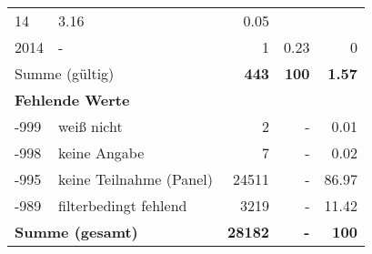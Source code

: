 \begin{longtable}{lXrrr}
       \num{14} &
       \num[round-mode=places,round-precision=2]{3.16} &
         \num[round-mode=places,round-precision=2]{0.05} \\

     2014 &
     \multicolumn{1}{X}{ -  } &


       \num{1} &
       \num[round-mode=places,round-precision=2]{0.23} &
         \num[round-mode=places,round-precision=2]{0} \\
     \midrule
     \multicolumn{2}{l}{Summe (gültig)} &
       \textbf{\num{443}} &
     \textbf{100} &
       \textbf{\num[round-mode=places,round-precision=2]{1.57}} \\
     \multicolumn{5}{l}{\textbf{Fehlende Werte}}\\
       -999 &
       weiß nicht &
         \num{2} &
        - &
         \num[round-mode=places,round-precision=2]{0.01} \\
       -998 &
       keine Angabe &
         \num{7} &
        - &
         \num[round-mode=places,round-precision=2]{0.02} \\
       -995 &
       keine Teilnahme (Panel) &
         \num{24511} &
        - &
         \num[round-mode=places,round-precision=2]{86.97} \\
       -989 &
       filterbedingt fehlend &
         \num{3219} &
        - &
         \num[round-mode=places,round-precision=2]{11.42} \\
     \midrule
     \multicolumn{2}{l}{\textbf{Summe (gesamt)}} &
          \textbf{\num{28182}} &
        \textbf{-} &
        \textbf{100} \\
     \bottomrule
     \end{longtable}
     
